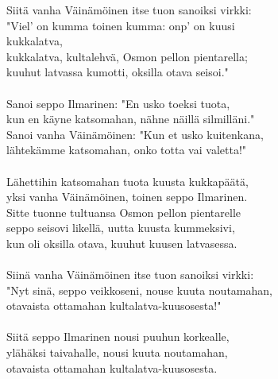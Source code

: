 Siitä vanha Väinämöinen itse tuon sanoiksi virkki:                \\
"Viel' on kumma toinen kumma: onp' on kuusi                       \\
kukkalatva,                                                       \\
kukkalatva, kultalehvä, Osmon pellon pientarella;                 \\
kuuhut latvassa kumotti, oksilla otava seisoi."                   \\
                                                                  \\
Sanoi seppo Ilmarinen: "En usko toeksi tuota,                     \\
kun en käyne katsomahan, nähne näillä silmilläni."                \\
Sanoi vanha Väinämöinen: "Kun et usko kuitenkana,                 \\
lähtekämme katsomahan, onko totta vai valetta!"                   \\
                                                                  \\
Lähettihin katsomahan tuota kuusta kukkapäätä,                    \\
yksi vanha Väinämöinen, toinen seppo Ilmarinen.                   \\
Sitte tuonne tultuansa Osmon pellon pientarelle                   \\
seppo seisovi likellä, uutta kuusta kummeksivi,                   \\
kun oli oksilla otava, kuuhut kuusen latvasessa.                  \\
                                                                  \\
Siinä vanha Väinämöinen itse tuon sanoiksi virkki:                \\
"Nyt sinä, seppo veikkoseni, nouse kuuta noutamahan,              \\
otavaista ottamahan kultalatva-kuusosesta!"                       \\
                                                                  \\
Siitä seppo Ilmarinen nousi puuhun korkealle,                     \\
ylähäksi taivahalle, nousi kuuta noutamahan,                      \\
otavaista ottamahan kultalatva-kuusosesta.                        \\
